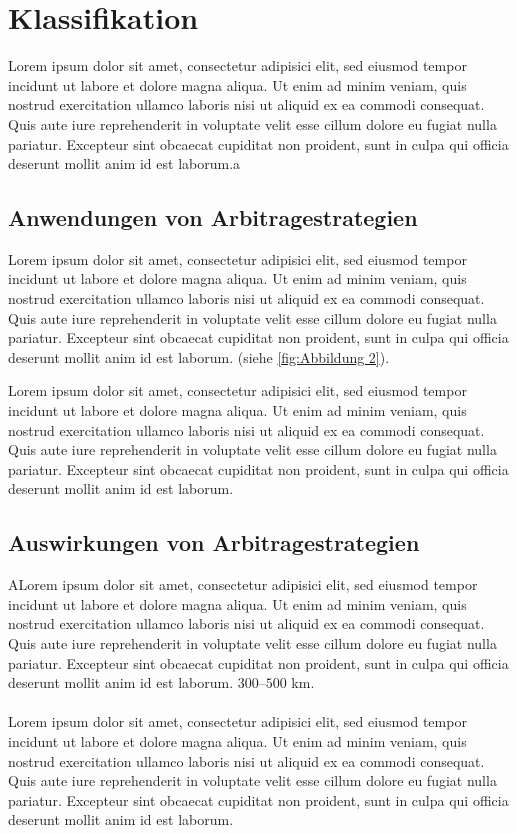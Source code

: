 
\section{Klassifikation}
Lorem ipsum dolor sit amet, consectetur adipisici elit, sed eiusmod tempor incidunt ut labore et dolore magna aliqua. Ut enim ad minim veniam, quis nostrud exercitation ullamco laboris nisi ut aliquid ex ea commodi consequat. Quis aute iure reprehenderit in voluptate velit esse cillum dolore eu fugiat nulla pariatur. Excepteur sint obcaecat cupiditat non proident, sunt in culpa qui officia deserunt mollit anim id est laborum.a
\subsection{Anwendungen von Arbitragestrategien}
Lorem ipsum dolor sit amet, consectetur adipisici elit, sed eiusmod tempor incidunt ut labore et dolore magna aliqua. Ut enim ad minim veniam, quis nostrud exercitation ullamco laboris nisi ut aliquid ex ea commodi consequat. Quis aute iure reprehenderit in voluptate velit esse cillum dolore eu fugiat nulla pariatur. Excepteur sint obcaecat cupiditat non proident, sunt in culpa qui officia deserunt mollit anim id est laborum. (siehe \autoref{fig:Abbildung 2}).
%

%
Lorem ipsum dolor sit amet, consectetur adipisici elit, sed eiusmod tempor incidunt ut labore et dolore magna aliqua. Ut enim ad minim veniam, quis nostrud exercitation ullamco laboris nisi ut aliquid ex ea commodi consequat. Quis aute iure reprehenderit in voluptate velit esse cillum dolore eu fugiat nulla pariatur. Excepteur sint obcaecat cupiditat non proident, sunt in culpa qui officia deserunt mollit anim id est laborum.

\subsection{Auswirkungen von Arbitragestrategien}
ALorem ipsum dolor sit amet, consectetur adipisici elit, sed eiusmod tempor incidunt ut labore et dolore magna aliqua. Ut enim ad minim veniam, quis nostrud exercitation ullamco laboris nisi ut aliquid ex ea commodi consequat. Quis aute iure reprehenderit in voluptate velit esse cillum dolore eu fugiat nulla pariatur. Excepteur sint obcaecat cupiditat non proident, sunt in culpa qui officia deserunt mollit anim id est laborum. $300$--$500$ km.\\
\\
Lorem ipsum dolor sit amet, consectetur adipisici elit, sed eiusmod tempor incidunt ut labore et dolore magna aliqua. Ut enim ad minim veniam, quis nostrud exercitation ullamco laboris nisi ut aliquid ex ea commodi consequat. Quis aute iure reprehenderit in voluptate velit esse cillum dolore eu fugiat nulla pariatur. Excepteur sint obcaecat cupiditat non proident, sunt in culpa qui officia deserunt mollit anim id est laborum.

